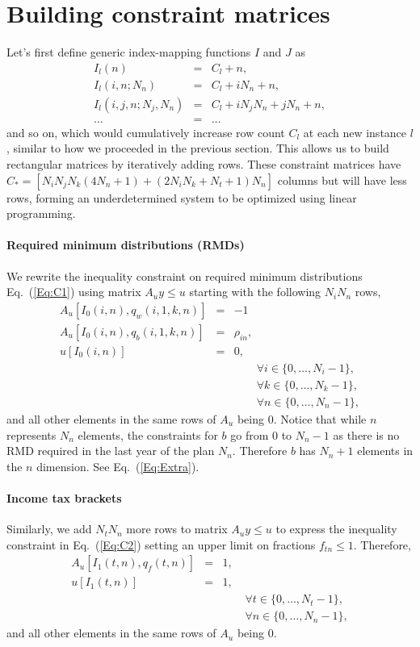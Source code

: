 \documentclass{article}[fleqn,12pt]
\begin{document}
\section{Building constraint matrices}
Let's first define generic index-mapping functions $I$ and $J$ as
\begin{eqnarray}
	\label{Eq:Offsets}
	I_l(n) &=& C_l + n, \nonumber \\
	I_l(i, n; N_n) &=& C_l + iN_n + n, \nonumber \\
	I_l(i, j, n; N_j, N_n) &=& C_l + iN_j N_n + jN_n +n, \\
	\ldots &=& \ldots \nonumber
\end{eqnarray}
and so on, which would cumulatively increase row count $C_l$ at each new instance $l$,
similar to how we proceeded in the previous section.
This allows us to build rectangular matrices by iteratively adding rows.
These constraint matrices have
$C_* = [N_iN_jN_k(4N_n + 1) + (2N_iN_k + N_t + 1) N_n]$
columns but will have less rows,
forming an underdetermined system to be optimized using linear programming.

\paragraph*{Required minimum distributions (RMDs)}
We rewrite the inequality constraint on required minimum distributions
Eq.~(\ref{Eq:C1}) using matrix $A_{u}y \le u$ starting with the following $N_iN_n$ rows, 
\begin{eqnarray}
	A_u[I_0(i, n), q_w(i, 1, k, n)] &=& -1 \nonumber \\
	A_u[I_0(i, n), q_b(i, 1, k, n)] &=& \rho_{in}, \nonumber \\
	u[I_0(i, n)] &=& 0, \\
	&&\qquad\forall i \in \{0,\ldots, N_i-1\}, \nonumber\\
	&&\qquad\forall k \in \{0,\ldots, N_k-1\}, \nonumber\\
	&&\qquad\forall n \in \{0,\ldots, N_n -1\},\nonumber
\end{eqnarray}
and all other elements in the same rows of $A_u$ being $0$.
Notice that while $n$ represents $N_n$ elements, the constraints
for $b$ go from $0$ to $N_n-1$ as there is no RMD required in the last year of the plan $N_n$.
Therefore $b$ has $N_n + 1$ elements in the $n$ dimension. See Eq.~(\ref{Eq:Extra}).

\paragraph*{Income tax brackets}
Similarly, we add $N_t N_n$ more rows to matrix $A_uy \le u$ to express
the inequality constraint in Eq.~(\ref{Eq:C2})
setting an upper limit on fractions $f_{t n} \le 1$. Therefore,
\begin{eqnarray}
	A_u[I_1(t, n), q_f(t, n)] &=& 1, \nonumber \\
	u[I_1(t, n)] &=& 1,\\
	&&\qquad\forall t \in \{0,\ldots, N_t-1\}, \nonumber\\
	&&\qquad\forall n \in \{0,\ldots, N_n -1\},\nonumber
\end{eqnarray}
and all other elements in the same rows of $A_u$ being $0$.
\end{document}
